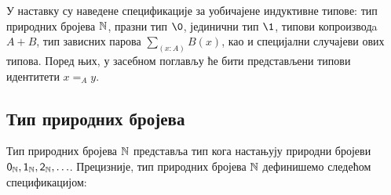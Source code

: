 \documentclass[12pt,oneside]{memoir}
\begin{document}
У наставку су наведене спецификације за уобичајене индуктивне типове: тип природних бројева ${\mathbb{N}}$, празни тип $\0$, јединични тип $\1$, типови копроизводa $A + B$, тип зависних парова $\sum_{(x : A)} B (x)$, као и специјални случајеви ових типова. Поред њих, у засебном поглављу ће бити представљени типови идентитети $x =_{A} y$.

\newpage%

\subsection{Тип природних бројева}

Тип природних бројева ${\mathbb{N}}$ представља тип кога настањују природни бројеви $\mathsf{0}_\mathbb{N}, \mathsf{1}_\mathbb{N}, \mathsf{2}_\mathbb{N}, \ldots$. Прецизније, тип природних бројева ${\mathbb{N}}$ дефинишемо следећом спецификацијом:
\end{document}
